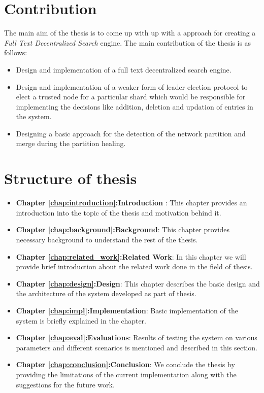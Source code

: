 \documentclass[12pt,a4paper,twoside,openright]{book}
\begin{document}
\section{Contribution}
\label{sec: contribution}

The main aim of the thesis is to come up with up with a approach for creating a \textit{Full Text Decentralized Search} engine. The main contribution of the thesis is as follows:

\begin{itemize}
	\item Design and implementation of a full text decentralized search engine.
	\item Design and implementation of a weaker form of leader election protocol to elect a trusted node for a particular shard which would be responsible for implementing the decisions like addition, deletion and updation of entries in the system.
	\item Designing a basic approach for the detection of the network partition and merge during the partition healing.
		
\end{itemize}



\section{Structure of thesis}
\label{sec:thesis_structure}

\begin{itemize}

\item[] \textbf{Chapter \ref{chap:introduction}:Introduction} : This chapter provides an introduction into the topic of the thesis and motivation behind it.

\item[] \textbf{Chapter \ref{chap:background}:Background}: This chapter provides necessary background to understand the rest of the thesis.

\item[] \textbf{Chapter \ref{chap:related_work}:Related Work}: In this chapter we will provide brief introduction about the related work done in the field of thesis.

\item[] \textbf{Chapter \ref{chap:design}:Design}: This chapter describes the basic design and the architecture of the system developed as part of thesis.

\item[] \textbf{Chapter \ref{chap:impl}:Implementation}: Basic implementation of the system is briefly explained in the chapter.

\item[] \textbf{Chapter \ref{chap:eval}:Evaluations}: Results of testing the system on various parameters and different scenarios is mentioned and described in this section.

\item[] \textbf{Chapter \ref{chap:conclusion}:Conclusion}: We conclude the thesis by providing the limitations of the current implementation along with the suggestions for the future work.

\end{itemize}
\end{document}
